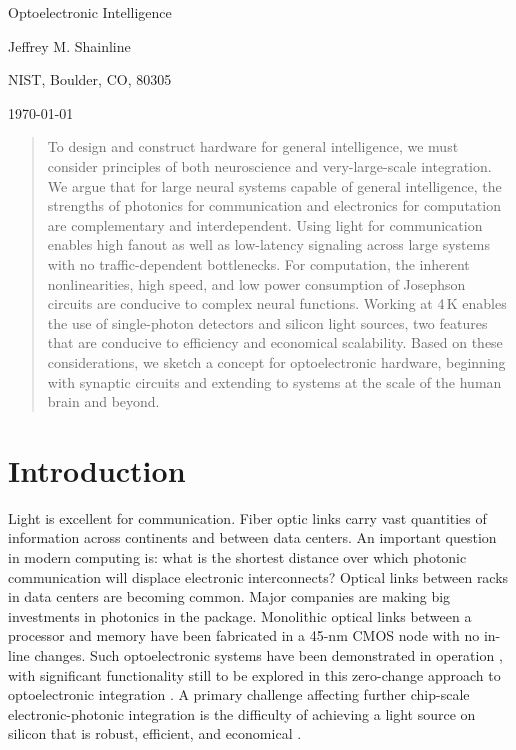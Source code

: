 \documentclass[twocolumn]{article}
\begin{document}
	
	\centerline{\LARGE Optoelectronic Intelligence}%
	\vspace{0.75em}
	\centerline{\Large Jeffrey M. Shainline}
	\vspace{0.5em}
	\centerline{\large NIST, Boulder, CO, 80305}
	\vspace{0.5em}
	\centerline{\large \today}
	
\begin{abstract}
To design and construct hardware for general intelligence, we must consider principles of both neuroscience and very-large-scale integration. We argue that for large neural systems capable of general intelligence, the strengths of photonics for communication and electronics for computation are complementary and interdependent. Using light for communication enables high fanout as well as low-latency signaling across large systems with no traffic-dependent bottlenecks. For computation, the inherent nonlinearities, high speed, and low power consumption of Josephson circuits are conducive to complex neural functions. Working at 4\,K enables the use of single-photon detectors and silicon light sources, two features that are conducive to efficiency and economical scalability. Based on these considerations, we sketch a concept for optoelectronic hardware, beginning with synaptic circuits and extending to systems at the scale of the human brain and beyond.
\end{abstract}

\section{\label{sec:introduction}Introduction}
Light is excellent for communication. Fiber optic links carry vast quantities of information across continents and between data centers. An important question in modern computing is: what is the shortest distance over which photonic communication will displace electronic interconnects? Optical links between racks in data centers are becoming common. Major companies are making big investments in photonics in the package. Monolithic optical links between a processor and memory have been fabricated in a 45-nm CMOS node with no in-line changes. Such optoelectronic systems have been demonstrated in operation \cite{suwa2015}, with significant functionality still to be explored in this zero-change approach to optoelectronic integration \cite{stra2018}. A primary challenge affecting further chip-scale electronic-photonic integration is the difficulty of achieving a light source on silicon that is robust, efficient, and economical \cite{shxu2007,libo2010,zhyi2015}.
\end{document}
